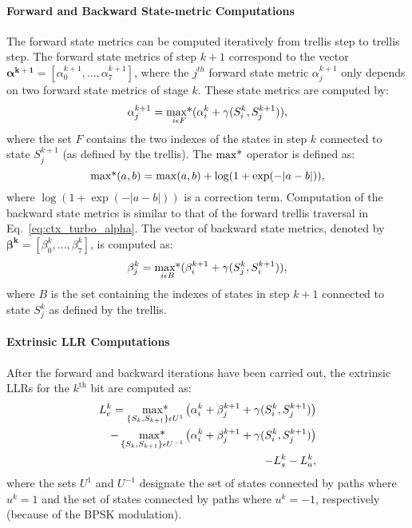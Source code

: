\paragraph{Forward and Backward State-metric Computations}

The forward state metrics can be computed iteratively from trellis step to
trellis step. The forward state metrics of step $k+1$ correspond to the vector
$\bm{\alpha^{k+1}} = [\alpha_0^{k+1}, ... ,\alpha_7^{k+1}]$, where the
$j^{th}$ forward state metric $\alpha_j^{k+1}$ only depends on two forward
state metrics of stage $k$. These state metrics are computed by:
\begin{equation}
  \label{eq:ctx_turbo_alpha}
  \alpha_j^{k+1} =
  \operatorname*{max*}_{i \epsilon F} ( \alpha_i^k + \gamma(S_i^k, S_j^{k+1}) ),
\end{equation}
where the set $F$ contains the two indexes of the states in step $k$ connected
to state $S_j^{k+1}$ (as defined by the trellis). The $\operatorname*{max*}$ operator is
defined as:
\begin{equation}
   \operatorname*{max*}(a,b) = \max(a,b) + \log(1 + \exp(-|a-b|)),
\end{equation}
where $\log(1 + \exp(-|a-b|))$ is a correction term.
Computation of the backward state metrics is similar to that of the forward
trellis traversal in Eq.~\ref{eq:ctx_turbo_alpha}. The vector of backward state
metrics, denoted by $\bm{\beta^k} = [\beta_0^k, ..., \beta_7^k]$, is
computed as:
\begin{equation}
  \label{eq:ctx_turbo_beta}
  \beta_j^k =
  \operatorname*{max*}_{i \epsilon B} ( \beta_i^{k+1} + \gamma(S_j^k, S_i^{k+1}) ),
\end{equation}
where $B$ is the set containing the indexes of states in step $k+1$ connected to
state $S_j^k$ as defined by the trellis.

\paragraph{Extrinsic LLR Computations}

After the forward and backward iterations have been carried out, the extrinsic
LLRs for the $k^\text{th}$ bit are computed as:
\begin{equation}
  \label{eq:ctx_turbo_ext}
  \begin{aligned}
  L_e^k = \operatorname*{max*}_{\{S_k, S_{k+1}\}\epsilon U^1}\big( \alpha_i^k + \beta_j^{k+1} +
  \gamma(S_i^k, S_j^{k+1}) \big) \\
  - \operatorname*{max*}_{\{S_k, S_{k+1}\}\epsilon U^{-1}}\big( \alpha_i^k + \beta_j^{k+1} +
  \gamma(S_i^k, S_j^{k+1}) \big) \\
  - L_{s}^k - L_a^k,
  \end{aligned}
\end{equation}
where the sets $U^1$ and $U^{-1}$ designate the set of states connected by paths
where $u^k=1$ and the set of states connected by paths where $u^k=-1$,
respectively (because of the BPSK modulation).

